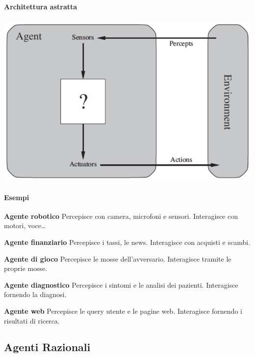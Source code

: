 \documentclass[10pt]{book}
\begin{document}
\paragraph{Architettura astratta}
\begin{center}
	\includegraphics[scale=0.7]{ambiente.png}
\end{center}
\paragraph{Esempi}
\begin{list}{}{}
	\item \textbf{Agente robotico} Percepisce con camera, microfoni e sensori. Interagisce con motori, voce\ldots
	\item \textbf{Agente finanziario} Percepisce i tassi, le news. Interagisce con acquisti e scambi.
	\item \textbf{Agente di gioco} Percepisce le mosse dell'avversario. Interagisce tramite le proprie mosse.
	\item \textbf{Agente diagnostico} Percepisce i sintomi e le analisi dei pazienti. Interagisce fornendo la diagnosi.
	\item \textbf{Agente web} Percepisce le query utente e le pagine web. Interagisce fornendo i risultati di ricerca.
\end{list}
\subsection{Agenti Razionali}
\end{document}
